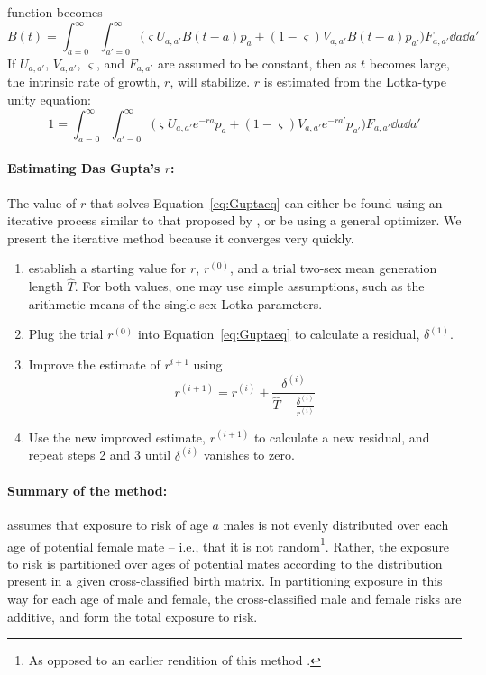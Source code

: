 function becomes
\begin{equation}
B(t) = \int_{a=0}^\infty \int_{a'=0}^\infty \Big( \varsigma U_{a,a'} B(t-a) p_a
+ (1-\varsigma)V_{a,a'}B(t-a) p_{a'}\Big)F_{a,a'} \dd a \dd a'
\end{equation}
If $U_{a,a'}$, $V_{a,a'}$, $\varsigma$, and $F_{a,a'}$ are assumed to
be constant, then as $t$ becomes large, the intrinsic rate of growth, $r$,
will stabilize. $r$ is estimated from the Lotka-type unity equation:
\begin{equation}
\label{eq:Guptaeq}
1 = \int_{a=0}^\infty \int_{a'=0}^\infty \Big( \varsigma U_{a,a'} e^{-ra} p_a
+ (1-\varsigma)V_{a,a'}e^{-ra'} p_{a'}\Big)F_{a,a'} \dd a \dd a'
\end{equation}
\paragraph{Estimating Das Gupta's $r$: } The value of $r$ that solves
Equation~\eqref{eq:Guptaeq} can either be found using an iterative 
process similar to that proposed by \citet{coale1957new}, or be using a general
optimizer. We present the iterative method because it converges very quickly.

\begin{enumerate}
  \item establish a starting value for $r$,
$r^{(0)}$, and a trial two-sex mean generation length
$\widehat{T}$. For both values, one may use simple
assumptions, such as the arithmetic means of the single-sex Lotka parameters.
  \item Plug the trial $r^{(0)}$ into Equation~\eqref{eq:Guptaeq}
  to calculate a residual, $\delta ^{(1)}$.
  \item Improve the estimate of $r^{i+1}$ using
  \begin{equation}
  r^{(i+1)} = r^{(i)} + \frac{\delta^{(i)}}{\widehat{T} -
\frac{\delta ^{(i)}}{r^{(i)} }}
  \end{equation}
  \item Use the new improved estimate, $r^{(i+1)}$ to calculate a new residual,
  and repeat steps 2 and 3 until $\delta^{(i)}$ vanishes to zero.
\end{enumerate}

\paragraph{Summary of the method: } \citet{gupta1978alternative} assumes that exposure to risk of
 age $a$ males is not evenly distributed over each age of potential female
 mate -- i.e., that it is not random\footnote{As opposed to an earlier rendition
 of this method \citep{gupta1972two}.}. Rather, the exposure to risk is
 partitioned over ages of potential mates according to the distribution present in a given 
 cross-classified birth matrix. In partitioning exposure in this way for each
 age of male and female, the cross-classified male and female risks are additive, and
 form the total exposure to risk. 
 

